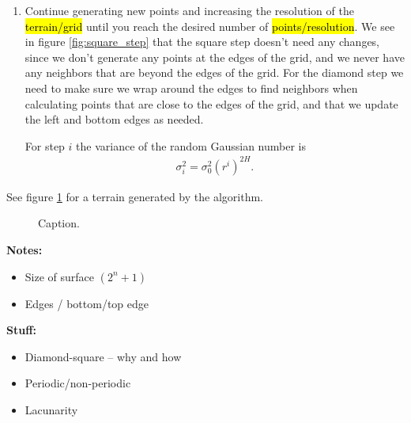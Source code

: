 \begin{enumerate}

    \item Continue generating new points and increasing the resolution of the \hl{terrain/grid} until you reach the desired number of \hl{points/resolution}. We see in figure \ref{fig:square_step} that the square step doesn't need any changes, since we don't generate any points at the edges of the grid, and we never have any neighbors that are beyond the edges of the grid. For the diamond step we need to make sure we wrap around the edges to find neighbors when calculating points that are close to the edges of the grid, and that we update the left and bottom edges as needed. 
    
    For step $i$ the variance of the random Gaussian number is
    \begin{align*}
        \sigma_i^2 = \sigma_0^2(r^i)^{2H}.
    \end{align*}
\end{enumerate}

See figure \ref{fig:diamond_square_terrain} for a terrain generated by the algorithm.

\begin{figure}
    \centering
    
    \caption{
        Caption.
        \label{fig:diamond_square_terrain}
    }
\end{figure}

\vspace{1cm}
{\bf Notes:}
\begin{itemize}
    \item Size of surface $(2^n+1)$
    \item Edges / bottom/top edge
\end{itemize}

{\bf Stuff:}
\begin{itemize}
    \item Diamond-square -- why and how
    \item Periodic/non-periodic
    \item Lacunarity
\end{itemize}

%     

